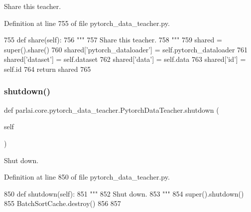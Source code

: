 \begin{DoxyVerb}Share this teacher.
\end{DoxyVerb}
 

Definition at line 755 of file pytorch\+\_\+data\+\_\+teacher.\+py.


\begin{DoxyCode}
755     \textcolor{keyword}{def }share(self):
756         \textcolor{stringliteral}{"""}
757 \textcolor{stringliteral}{        Share this teacher.}
758 \textcolor{stringliteral}{        """}
759         shared = super().share()
760         shared[\textcolor{stringliteral}{'pytorch\_dataloader'}] = self.pytorch\_dataloader
761         shared[\textcolor{stringliteral}{'dataset'}] = self.dataset
762         shared[\textcolor{stringliteral}{'data'}] = self.data
763         shared[\textcolor{stringliteral}{'id'}] = self.id
764         \textcolor{keywordflow}{return} shared
765 
\end{DoxyCode}
\mbox{\label{classparlai_1_1core_1_1pytorch__data__teacher_1_1PytorchDataTeacher_a20ae09e79b2747f8f4c769dda0453937}} 
\subsubsection{\texorpdfstring{shutdown()}{shutdown()}}
{\footnotesize\ttfamily def parlai.\+core.\+pytorch\+\_\+data\+\_\+teacher.\+Pytorch\+Data\+Teacher.\+shutdown (\begin{DoxyParamCaption}\item[{}]{self }\end{DoxyParamCaption})}

\begin{DoxyVerb}Shut down.
\end{DoxyVerb}
 

Definition at line 850 of file pytorch\+\_\+data\+\_\+teacher.\+py.


\begin{DoxyCode}
850     \textcolor{keyword}{def }shutdown(self):
851         \textcolor{stringliteral}{"""}
852 \textcolor{stringliteral}{        Shut down.}
853 \textcolor{stringliteral}{        """}
854         super().shutdown()
855         BatchSortCache.destroy()
856 
857 
\end{DoxyCode}


